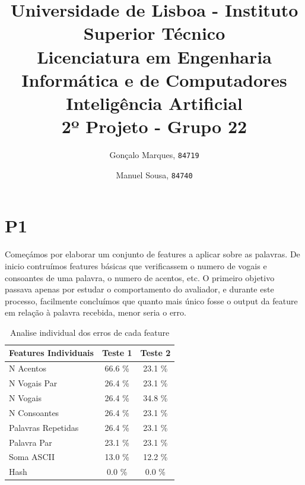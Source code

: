 \documentclass[11pt,twocolumn]{article}
\begin{document}
    
    \title{
        \textnormal{
        \LARGE Universidade de Lisboa - Instituto Superior Técnico\\
        \Large Licenciatura em Engenharia Informática e de Computadores\\
        \Large Inteligência Artificial
    \\}
        \LARGE2º Projeto - Grupo 22
        \vspace{-1ex}
        }
    \author{Gonçalo Marques,
        \texttt{84719}
        \and
        Manuel Sousa,
        \texttt{84740}
    }
    \date{	\vspace{-1ex}
            \vspace{-4ex}
        }
    \maketitle
    
    \section*{P1}
    
    Começámos por elaborar um conjunto de features a aplicar sobre as palavras. De inicio contruímos features básicas que verificassem o numero de vogais e consoantes de uma palavra, o numero de acentos, etc. O primeiro objetivo passava apenas por estudar
    o comportamento do avaliador, e durante este processo, facilmente concluímos que quanto mais único fosse o output da feature em relação à palavra recebida, menor seria o erro.
    
    
    \begin{table}[htbp]
        \centering
        \caption{Analise individual dos erros de cada feature}
        \label{my-label}
        \begin{tabular}{|l|c|c|}
        \hline
        \multicolumn{1}{|c|}{Features Individuais}     & \textbf{Teste 1} & \textbf{Teste 2}                    \\ \hline
        [F1] N Acentos & 66.6 \%   & 23.1 \% \\ \hline
        [F2] N Vogais Par & 26.4 \%   & 23.1 \% \\ \hline
        [F3] N Vogais & 26.4 \%   & 34.8 \% \\ \hline
        [F4] N Consoantes   & 26.4 \%  & 23.1 \%      \\ \hline
        [F5] Palavras Repetidas   & 26.4 \%  & 23.1 \%      \\ \hline
        [F6] Palavra Par   & 23.1 \%  & 23.1 \%      \\ \hline
        [F7] Soma ASCII                             & 13.0 \%            & 12.2 \%                                \\ \hline
        [F8] Hash                             & 0.0 \%              & 0.0 \%                                \\ \hline
        \end{tabular}
        \end{table}
    \par
\end{document}
